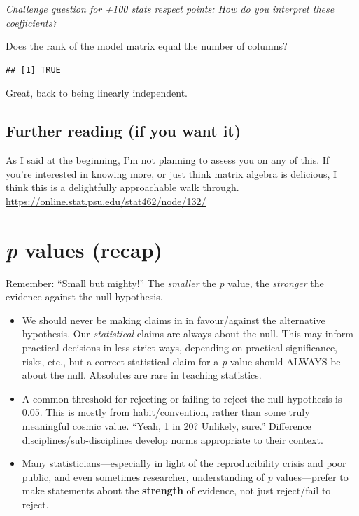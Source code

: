 \documentclass[
  openany]{book}
\providecommand{\tightlist}{%
  \setlength{\itemsep}{0pt}\setlength{\parskip}{0pt}}
\begin{document}
\emph{Challenge question for +100 stats respect points: How do you interpret these coefficients?}

Does the rank of the model matrix equal the number of columns?

\begin{verbatim}
## [1] TRUE
\end{verbatim}

Great, back to being linearly independent.

\hypertarget{further-reading-if-you-want-it}{%
\subsection{Further reading (if you want it)}\label{further-reading-if-you-want-it}}

As I said at the beginning, I'm not planning to assess you on any of this. If you're interested in knowing more, or just think matrix algebra is delicious, I think this is a delightfully approachable walk through. \url{https://online.stat.psu.edu/stat462/node/132/}

\hypertarget{p-values-recap}{%
\section{\texorpdfstring{\emph{p} values (recap)}{p values (recap)}}\label{p-values-recap}}

Remember: ``Small but mighty!'' The \emph{smaller} the \emph{p} value, the \emph{stronger} the evidence against the null hypothesis.

\begin{itemize}
\tightlist
\item
  We should never be making claims in in favour/against the alternative hypothesis. Our \emph{statistical} claims are always about the null. This may inform practical decisions in less strict ways, depending on practical significance, risks, etc., but a correct statistical claim for a \emph{p} value should ALWAYS be about the null. Absolutes are rare in teaching statistics.\\
\item
  A common threshold for rejecting or failing to reject the null hypothesis is 0.05. This is mostly from habit/convention, rather than some truly meaningful cosmic value. ``Yeah, 1 in 20? Unlikely, sure.'' Difference disciplines/sub-disciplines develop norms appropriate to their context.
\item
  Many statisticians---especially in light of the reproducibility crisis and poor public, and even sometimes researcher, understanding of \emph{p} values---prefer to make statements about the \textbf{strength} of evidence, not just reject/fail to reject.
\end{itemize}
\end{document}
